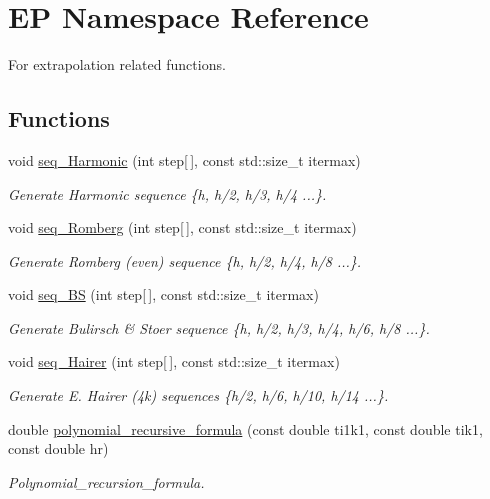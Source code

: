 \hypertarget{namespaceEP}{}\section{EP Namespace Reference}
\label{namespaceEP}


For extrapolation related functions.  


\subsection*{Functions}
\begin{DoxyCompactItemize}
\item 
void \hyperlink{namespaceEP_a6197a74bc7ca232ffcc84872d8f4f779}{seq\+\_\+\+Harmonic} (int step\mbox{[}$\,$\mbox{]}, const std\+::size\+\_\+t itermax)
\begin{DoxyCompactList}\small\item\em Generate Harmonic sequence \{h, h/2, h/3, h/4 ...\}. \end{DoxyCompactList}\item 
void \hyperlink{namespaceEP_afaef3617ed3fb4ad4627c19e955c5457}{seq\+\_\+\+Romberg} (int step\mbox{[}$\,$\mbox{]}, const std\+::size\+\_\+t itermax)
\begin{DoxyCompactList}\small\item\em Generate Romberg (even) sequence \{h, h/2, h/4, h/8 ...\}. \end{DoxyCompactList}\item 
void \hyperlink{namespaceEP_a1c85d6f300251929ac82736e54760652}{seq\+\_\+\+BS} (int step\mbox{[}$\,$\mbox{]}, const std\+::size\+\_\+t itermax)
\begin{DoxyCompactList}\small\item\em Generate Bulirsch \& Stoer sequence \{h, h/2, h/3, h/4, h/6, h/8 ...\}. \end{DoxyCompactList}\item 
void \hyperlink{namespaceEP_a691e74f494e1137b68389a2bd93f92c0}{seq\+\_\+\+Hairer} (int step\mbox{[}$\,$\mbox{]}, const std\+::size\+\_\+t itermax)
\begin{DoxyCompactList}\small\item\em Generate E. Hairer (4k) sequences \{h/2, h/6, h/10, h/14 ...\}. \end{DoxyCompactList}\item 
double \hyperlink{namespaceEP_a8f951202841accc906325f37f9e592af}{polynomial\+\_\+recursive\+\_\+formula} (const double ti1k1, const double tik1, const double hr)
\begin{DoxyCompactList}\small\item\em Polynomial\+\_\+recursion\+\_\+formula. \end{DoxyCompactList}\item 

\end{DoxyCompactItemize}
